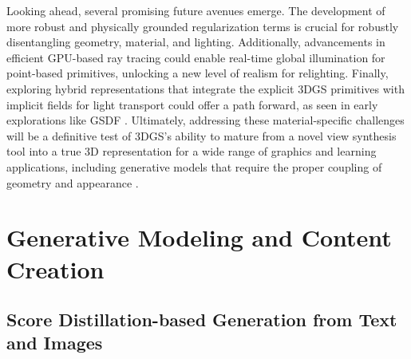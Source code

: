 \documentclass[11pt,a4paper]{article}
\begin{document}
Looking ahead, several promising future avenues emerge. The development of more robust and physically grounded regularization terms is crucial for robustly disentangling geometry, material, and lighting. Additionally, advancements in efficient GPU-based ray tracing could enable real-time global illumination for point-based primitives, unlocking a new level of realism for relighting. Finally, exploring hybrid representations that integrate the explicit 3DGS primitives with implicit fields for light transport could offer a path forward, as seen in early explorations like GSDF \cite{arxiv:2403.16964v1}. Ultimately, addressing these material-specific challenges will be a definitive test of 3DGS's ability to mature from a novel view synthesis tool into a true 3D representation for a wide range of graphics and learning applications, including generative models that require the proper coupling of geometry and appearance \cite{arxiv:2402.07181v1,arxiv:2401.03890v2}.


\section{Generative Modeling and Content Creation}



\subsection{Score Distillation-based Generation from Text and Images}
\end{document}
